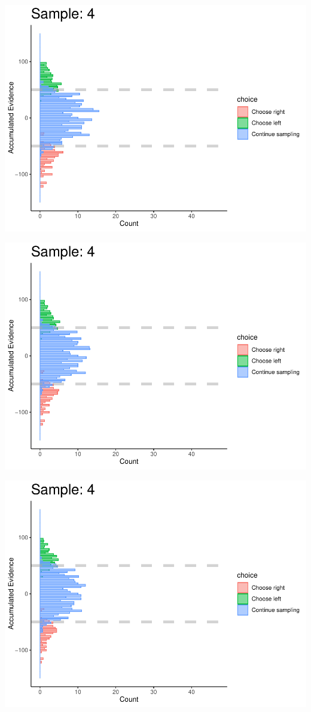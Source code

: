 \documentclass[
]{book}
\begin{document}
\begin{center}\includegraphics[width=0.8\linewidth]{LateNightBayes_files/figure-latex/fixed_check-37} \end{center}

\begin{center}\includegraphics[width=0.8\linewidth]{LateNightBayes_files/figure-latex/fixed_check-38} \end{center}

\begin{center}\includegraphics[width=0.8\linewidth]{LateNightBayes_files/figure-latex/fixed_check-39} \end{center}
\end{document}
